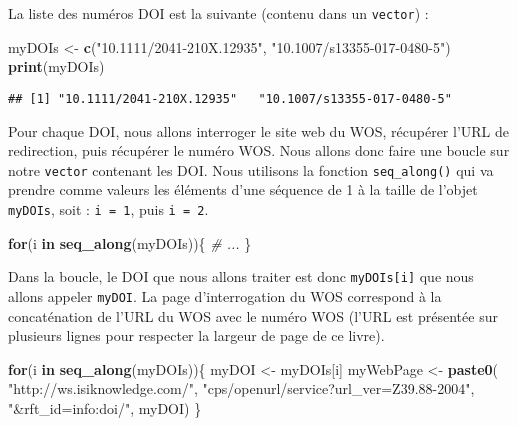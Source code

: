 \documentclass[]{book}
\newenvironment{Shaded}{\begin{snugshade}}{\end{snugshade}}
\newcommand{\KeywordTok}[1]{\textcolor[rgb]{0.13,0.29,0.53}{\textbf{#1}}}
\newcommand{\StringTok}[1]{\textcolor[rgb]{0.31,0.60,0.02}{#1}}
\newcommand{\CommentTok}[1]{\textcolor[rgb]{0.56,0.35,0.01}{\textit{#1}}}
\newcommand{\ControlFlowTok}[1]{\textcolor[rgb]{0.13,0.29,0.53}{\textbf{#1}}}
\newcommand{\NormalTok}[1]{#1}
\theoremstyle{definition}
\theoremstyle{definition}
\theoremstyle{definition}
\theoremstyle{remark}
\begin{document}
La liste des numéros DOI est la suivante (contenu dans un
\texttt{vector}) :

\begin{Shaded}
\begin{Highlighting}[]
\NormalTok{myDOIs <-}\StringTok{ }\KeywordTok{c}\NormalTok{(}\StringTok{"10.1111/2041-210X.12935"}\NormalTok{, }\StringTok{"10.1007/s13355-017-0480-5"}\NormalTok{)}
\KeywordTok{print}\NormalTok{(myDOIs)}
\end{Highlighting}
\end{Shaded}

\begin{verbatim}
## [1] "10.1111/2041-210X.12935"   "10.1007/s13355-017-0480-5"
\end{verbatim}

Pour chaque DOI, nous allons interroger le site web du WOS, récupérer
l'URL de redirection, puis récupérer le numéro WOS. Nous allons donc
faire une boucle sur notre \texttt{vector} contenant les DOI. Nous
utilisons la fonction \texttt{seq\_along()} qui va prendre comme valeurs
les éléments d'une séquence de 1 à la taille de l'objet \texttt{myDOIs},
soit : \texttt{i\ =\ 1}, puis \texttt{i\ =\ 2}.

\begin{Shaded}
\begin{Highlighting}[]
\ControlFlowTok{for}\NormalTok{(i }\ControlFlowTok{in} \KeywordTok{seq_along}\NormalTok{(myDOIs))\{}
  \CommentTok{# ...}
\NormalTok{\}}
\end{Highlighting}
\end{Shaded}

Dans la boucle, le DOI que nous allons traiter est donc
\texttt{myDOIs{[}i{]}} que nous allons appeler \texttt{myDOI}. La page
d'interrogation du WOS correspond à la concaténation de l'URL du WOS
avec le numéro WOS (l'URL est présentée sur plusieurs lignes pour
respecter la largeur de page de ce livre).

\begin{Shaded}
\begin{Highlighting}[]
\ControlFlowTok{for}\NormalTok{(i }\ControlFlowTok{in} \KeywordTok{seq_along}\NormalTok{(myDOIs))\{}
\NormalTok{  myDOI <-}\StringTok{ }\NormalTok{myDOIs[i]}
\NormalTok{  myWebPage <-}\StringTok{ }\KeywordTok{paste0}\NormalTok{(}
    \StringTok{"http://ws.isiknowledge.com/"}\NormalTok{, }
    \StringTok{"cps/openurl/service?url_ver=Z39.88-2004"}\NormalTok{, }
    \StringTok{"&rft_id=info:doi/"}\NormalTok{, myDOI)}
\NormalTok{\}}
\end{Highlighting}
\end{Shaded}
\end{document}
